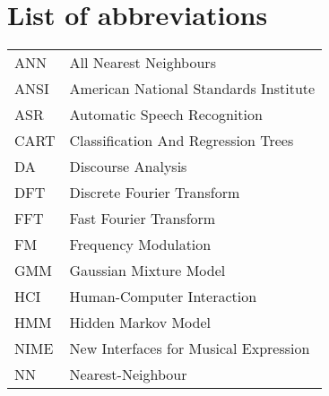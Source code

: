 \chapter*{List of abbreviations}

\begin{table}[htbp]
\begin{center}
\begin{tabular}{ll}

ANN  	&	All Nearest Neighbours		\\
ANSI 	&	American National Standards Institute		\\
ASR  	&	Automatic Speech Recognition		\\
CART    &	Classification And Regression Trees		\\
DA    	&	Discourse Analysis		\\
DFT  	&	Discrete Fourier Transform		\\
FFT   	&	Fast Fourier Transform		\\
FM    	&	Frequency Modulation		\\
GMM 	&	Gaussian Mixture Model		\\
HCI   	&	Human-Computer Interaction		\\
HMM    	&	Hidden Markov Model		\\
NIME  	&	New Interfaces for Musical Expression		\\
NN    	&	Nearest-Neighbour		\\

\end{tabular}
\end{center}
\end{table}%